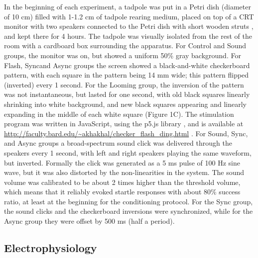 \documentclass{article}
\providecommand{\DIFaddtex}[1]{{\protect\color{blue}{#1}}} %
\providecommand{\DIFaddbegin}{} %
\providecommand{\DIFaddend}{} %
\providecommand{\DIFadd}[1]{\texorpdfstring{\DIFaddtex{#1}}{#1}} %
\newcommand{\DIFaddincludegraphics}[2][]{{\color{blue}\fbox{\DIFOincludegraphics[#1]{#2}}}} %
\DeclareRobustCommand{\DIFaddbegin}{\DIFOaddbegin \let\includegraphics\DIFaddincludegraphics} %
\DeclareRobustCommand{\DIFaddend}{\DIFOaddend \let\includegraphics\DIFOincludegraphics} %
\begin{document}
In the beginning of each experiment, a tadpole was put in a Petri dish (diameter of 10 cm) filled with 1-1.2 cm of tadpole rearing medium, placed on top of a CRT monitor with two speakers connected to the Petri dish with short wooden struts \citep{james2015,truszkowski2017}, and kept there for 4 hours. The tadpole was visually isolated from the rest of the room with a cardboard box surrounding the apparatus. For Control and Sound groups, the monitor was on, but showed a uniform 50\% gray background. For Flash, Sync\DIFaddbegin \DIFadd{, }\DIFaddend and Async groups the screen showed a black-and-white checkerboard pattern, with each square in the pattern being 14 mm wide; this pattern flipped (inverted) every 1 second. For the Looming group, the inversion of the pattern was not instantaneous, but lasted for one second, with old black squares linearly shrinking into white background, and new black squares appearing and linearly expanding in the middle of each white square (Figure 1C). The stimulation program was written in JavaScript, using the p5.js library \citep{mccarthy2015}, and is available at \url{http://faculty.bard.edu/~akhakhal/checker_flash_ding.html} . For Sound, Sync, and Async groups a broad-spectrum sound click was delivered through the speakers every 1 second, with left and right speakers playing the same waveform, but inverted. Formally the click was generated as a 5 ms pulse of 100 Hz sine wave, but it was also distorted by the non-linearities in the system. The sound volume was calibrated to be about 2 times higher than the threshold volume, which means that it reliably evoked startle responses with about 80\% success ratio, at least at the beginning for the conditioning protocol. For the Sync group, the sound clicks and the checkerboard inversions were synchronized, while for the Async group they were offset by 500 ms (half a period).

\subsection*{Electrophysiology}
\end{document}
